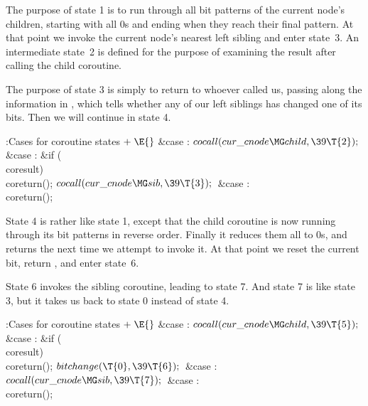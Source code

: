 The purpose of state 1 is to run through all bit patterns of the
current node's children, starting with all 0s and ending when they reach their
final pattern.
At that point we invoke the current node's nearest left sibling
and enter state~3. An intermediate state~2 is defined for the purpose
of examining the result after calling the child coroutine.

The purpose of state 3 is simply to return to whoever called us,
passing along the information in , which tells whether
any of our left siblings has changed one of its bits. Then we will
continue in state 4.

\Y\B\4:Cases for coroutine states\X${}\mathrel+\E{}$\6
\4\&{case} :\5
${}\\{cocall}(\\{cur\_cnode}\MG\\{child},\39\T{2});{}$\6
\4\&{case} :\5
\&{if} (\\{coresult})\1\5
\\{coreturn}();\2\6
${}\\{cocall}(\\{cur\_cnode}\MG\\{sib},\39\T{3});{}$\6
\4\&{case} :\5
\\{coreturn}();\par
\fi

State 4 is rather like state 1, except that the child coroutine is now
running through its bit patterns in reverse order. Finally it reduces them
all to 0s, and returns  the next time we attempt to invoke it.
At that point we reset the current bit, return , and enter
state~6.

State 6 invokes the sibling coroutine, leading to state 7.
And state 7 is like state 3, but it takes us back to state 0 instead
of state 4.

\Y\B\4:Cases for coroutine states\X${}\mathrel+\E{}$\6
\4\&{case} :\5
${}\\{cocall}(\\{cur\_cnode}\MG\\{child},\39\T{5});{}$\6
\4\&{case} :\5
\&{if} (\\{coresult})\1\5
\\{coreturn}();\2\6
${}\\{bitchange}(\T{0},\39\T{6});{}$\6
\4\&{case} :\5
${}\\{cocall}(\\{cur\_cnode}\MG\\{sib},\39\T{7});{}$\6
\4\&{case} :\5
\\{coreturn}();\par
\fi

